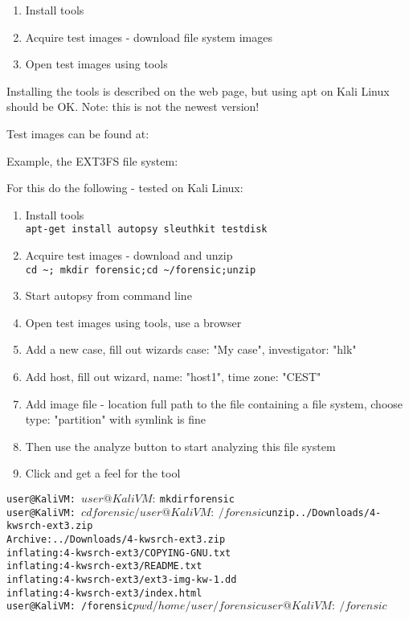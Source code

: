 \documentclass[a4paper,11pt,notitlepage]{report}
\begin{document}


\begin{enumerate}
\item Install tools
\item Acquire test images - download file system images
\item Open test images using tools
\end{enumerate}

Installing the tools is described on the web page, but using apt on Kali Linux should be OK. Note: this is not the newest version!

Test images can be found at:\\

Example, the EXT3FS file system:\\

For this do the following - tested on Kali Linux:
\begin{enumerate}
\item Install tools\\
\verb+apt-get install autopsy sleuthkit testdisk+
\item Acquire test images - download and unzip\\
\verb+cd ~; mkdir forensic;cd ~/forensic;unzip  +
\item Start autopsy from command line
\item Open test images using tools, use a browser 
\item Add a new case, fill out wizards case: "My case", investigator: "hlk"
\item Add host, fill out wizard, name: "host1", time zone: "CEST"
\item Add image file - location full path to the file containing a file system, choose type: "partition" with symlink is fine
\item Then use the analyze button to start analyzing this file system
\item Click and get a feel for the tool
\end{enumerate}

\begin{alltt}
user@KaliVM:~$
user@KaliVM:~$ mkdir forensic
user@KaliVM:~$ cd forensic/
user@KaliVM:~/forensic$ unzip ../Downloads/4-kwsrch-ext3.zip
Archive:  ../Downloads/4-kwsrch-ext3.zip
  inflating: 4-kwsrch-ext3/COPYING-GNU.txt
  inflating: 4-kwsrch-ext3/README.txt
  inflating: 4-kwsrch-ext3/ext3-img-kw-1.dd
  inflating: 4-kwsrch-ext3/index.html
user@KaliVM:~/forensic$ pwd
/home/user/forensic
user@KaliVM:~/forensic$
\end{alltt}
\end{document}
